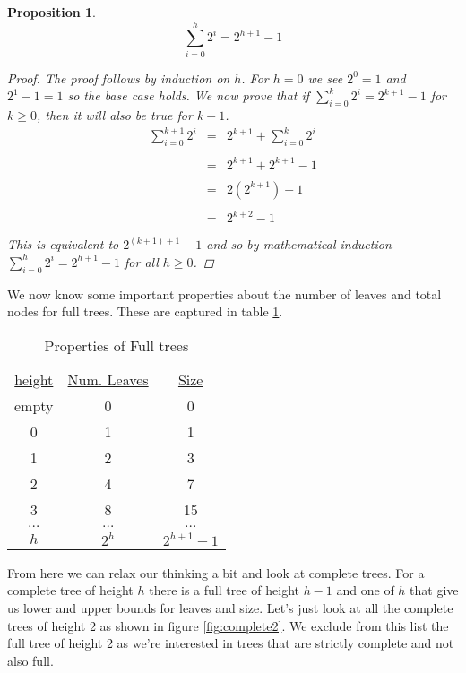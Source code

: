 \documentclass[]{tufte-handout}
\newtheorem{proposition}{Proposition}
\begin{document}
\begin{proposition}
\[\sum\limits_{i=0}^{h} 2^i = 2^{h+1}-1\]
\begin{proof}
The proof follows by induction on $h$. For $h=0$ we see $2^0 = 1$ and $2^{1}-1= 1$ so the base case holds. We now prove that if $\sum\limits_{i=0}^{k} 2^i = 2^{k+1}-1$ for $k\geq0$, then it will also be true for $k+1$. 
\begin{equation*}
\begin{array}{lcr}
\sum\limits_{i=0}^{k+1} 2^i &=& 2^{k+1} + \sum\limits_{i=0}^{k} 2^i \\ \\
 &=& 2^{k+1} + 2^{k+1} - 1 \\ \\
 &=& 2(2^{k+1}) - 1 \\ \\
  &=& 2^{k+2} - 1 \\ \\
\end{array}
\end{equation*}
This is equivalent to $2^{(k+1)+1}-1$ and so by mathematical induction $\sum\limits_{i=0}^{h} 2^i = 2^{h+1}-1$ for all $h\geq0$.
\end{proof}
\end{proposition}

We now know some important properties about the number of leaves and total nodes for full trees. These are captured in table \ref{tab:fulltrees}.

\begin{table}
\begin{tabular}{ccc}
\underline{height} & \underline{Num. Leaves} & \underline{Size} \\
empty & 0 & 0 \\
0 & 1 & 1\\
1 & 2 & 3\\
2 & 4 & 7\\
3 & 8 & 15\\
$\ldots$ & $\ldots$ & $\ldots$ \\
$h$ & $2^h$ & $2^{h+1}-1$ 
\end{tabular}
\caption{Properties of Full trees}
\label{tab:fulltrees}
\end{table}

From here we can relax our thinking a bit and look at complete trees. For a complete tree of height $h$ there is a full tree of height $h-1$ and one of $h$ that give us lower and upper bounds for leaves and size. Let's just look at all the complete trees of height 2 as shown in figure \ref{fig:complete2}. We exclude from this list the full tree of height 2 as we're interested in trees that are strictly complete and not also full. 
\end{document}

